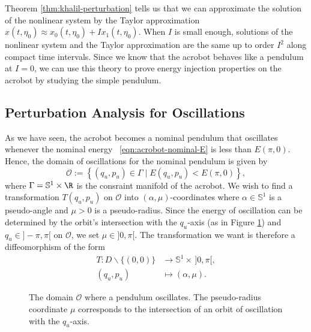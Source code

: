 Theorem \ref{thm:khalil-perturbation} tells us that we can approximate the
solution of the nonlinear system by the Taylor approximation 
\(x(t,\eta_0) \approx x_0(t,\eta_0) + I x_1(t,\eta_0)\).
When \(I\) is small enough, solutions of the nonlinear system and
the Taylor approximation are the same up to order \(I^2\) along compact time
intervals.
Since we know that the acrobot behaves like a pendulum at \(I = 0\), we can
use this theory to prove energy injection properties on the acrobot by studying
the simple pendulum.
 
\subsection*{Perturbation Analysis for Oscillations}
As we have seen, the acrobot becomes a nominal pendulum that oscillates whenever the
nominal energy ~\eqref{eqn:acrobot-nominal-E} is less than \(E(\pi,0)\).
Hence, the domain of oscillations for the nominal pendulum is given by
\[
    \mathcal{O} := \left\{ (q_u,p_u) \in \Gamma \mid E(q_u,p_u) < E(\pi,0)\right\}
    ,
\]
where \(\Gamma = \mathbb{S}^1\times\R\) is the consraint manifold of the
acrobot.
We wish to find a transformation \(T(q_u,p_u)\) on \(\mathcal{O}\) into
\((\alpha,\mu)\)-coordinates where \(\alpha \in \mathbb{S}^1\) is a pseudo-angle
and \(\mu > 0\) is a pseudo-radius.
Since the energy of oscillation can be determined by the orbit's intersection
with the \(q_u\)-axis (as in Figure \ref{fig:mu-intersection}) 
and \(q_u \in ]-\pi,\pi[\) on \(\mathcal{O}\), we set \(\mu \in ]0,\pi[\).
The transformation we want is therefore a diffeomorphism of the form
\begin{align*}
    T : D\backslash \{(0,0)\} &\rightarrow \mathbb{S}^1 \times \, ]0,\pi[, \\
    (q_u, p_u) &\mapsto (\alpha,\mu)
    .
\end{align*}

\begin{figure}
    \centering
    \caption{The domain \(\mathcal{O}\) where a pendulum oscillates.
    The pseudo-radius coordinate \(\mu\) corresponds to the
    intersection of an orbit of oscillation with the \(q_u\)-axis.}
    \label{fig:mu-intersection}
\end{figure}

